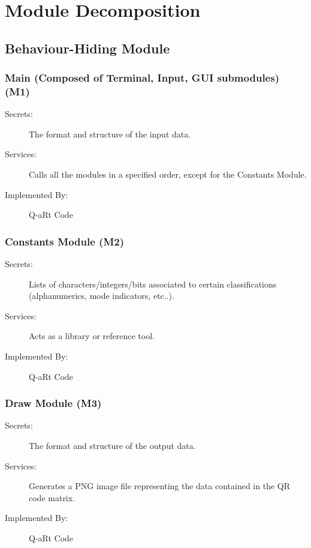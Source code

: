 \documentclass[12pt, titlepage]{article}
\begin{document}
\section{Module Decomposition} \label{SecMD}


\subsection{Behaviour-Hiding Module}

\subsubsection{Main (Composed of Terminal, Input, GUI submodules) (M1)}

\begin{description}
\item[Secrets:] The format and structure of the input data.
\item[Services:] Calls all the modules in a specified order, except for the Constants Module.
\item[Implemented By:] Q-aRt Code
\end{description}

\subsubsection{Constants Module (M2)}

\begin{description}
\item[Secrets:] Lists of characters/integers/bits associated to certain classifications (alphanumerics, mode indicators, etc..).
\item[Services:] Acts as a library or reference tool.
\item[Implemented By:] Q-aRt Code
\end{description}

\subsubsection{Draw Module (M3)}

\begin{description}
\item[Secrets:] The format and structure of the output data.
\item[Services:] Generates a PNG image file representing the data contained in the QR code matrix.
\item[Implemented By:] Q-aRt Code
\end{description}
\end{document}
